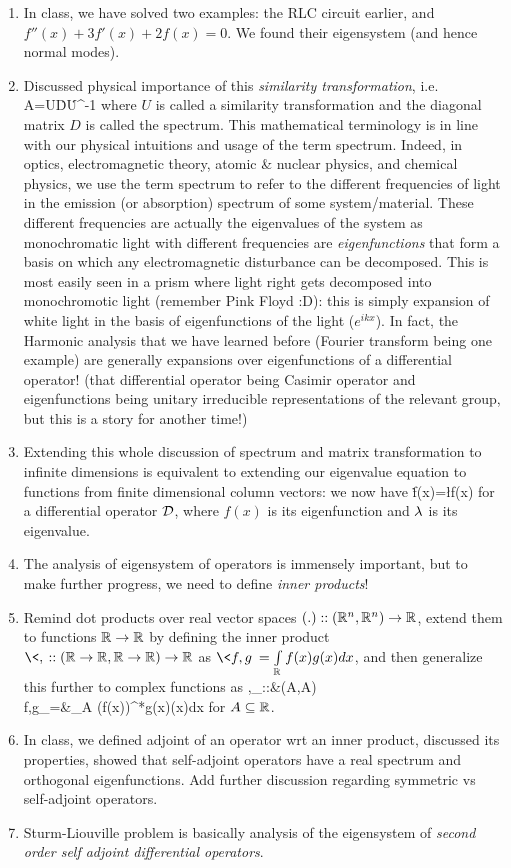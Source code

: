 {\begin{enumerate}
		\item In class, we have solved two examples: the RLC circuit earlier, and $f''(x)+3f'(x)+2f(x)=0$. We found their eigensystem (and hence normal modes).
		\item Discussed physical importance of this \emph{similarity transformation}, i.e. 
		\be 
		A=U\.D\.U^{-1}
		\ee 
		where $U$ is called a similarity transformation and the diagonal matrix $D$ is called the spectrum. This mathematical terminology is in line with our physical intuitions and usage of the term spectrum. Indeed, in optics, electromagnetic theory, atomic \& nuclear physics, and chemical physics, we use the term spectrum to refer to the different frequencies of light in the emission (or absorption) spectrum of  some system/material. These different frequencies are actually the eigenvalues of the system as monochromatic light with different frequencies are \emph{eigenfunctions} that form a basis on which any electromagnetic disturbance can be decomposed. This is most easily seen in a prism where light right gets decomposed into monochromotic light (remember Pink Floyd :D): this is simply expansion of white light in the basis of eigenfunctions of the light ($e^{ikx}$). In fact, the Harmonic analysis that we have learned before (Fourier transform being one example) are generally expansions over eigenfunctions of a differential operator! (that differential operator being Casimir operator and eigenfunctions being unitary irreducible representations of the relevant group, but this is a story for another time!)
		\item Extending this whole discussion of spectrum and matrix transformation to infinite dimensions is equivalent to extending our eigenvalue equation to functions from finite dimensional column vectors: we now have
		\be 
		\cD\. f(x)=\l f(x)
		\ee 
		for a differential operator $\mathcal{D}$, where $f(x)$ is its eigenfunction and $\lambda$ is its eigenvalue.
		\item The analysis of eigensystem of operators is immensely important, but to make further progress, we need to define \emph{inner products}!
		\item Remind dot products over real vector spaces $(.)::(\mathbb{R}^n,\mathbb{R}^n)\to \mathbb{R}$, extend them to functions $\mathbb{R}\to\mathbb{R}$ by defining the inner product $\<,\>::(\R\to\R,\R\to\R)\to\R$ as $\<f,g\>=\int\limits_\R f(x)g(x)dx$, and then generalize this further to complex functions as 
		\bea
		\<,\>_\w::{}&{}(A\to\C,A\to\C)\to\C \\
		\<f,g\>_\w={}&{}\int\limits_A \Big(f(x)\Big)^*g(x)\w(x)dx
		\eea
		for $A\subseteq\mathbb{R}$.
		\item In class, we defined adjoint of an operator wrt an inner product, discussed its properties, showed that self-adjoint operators have a real spectrum and orthogonal eigenfunctions. Add further discussion regarding symmetric vs self-adjoint operators.
		\item Sturm-Liouville problem is basically analysis of the eigensystem of \emph{second order self adjoint differential operators}.
	\end{enumerate}
}

